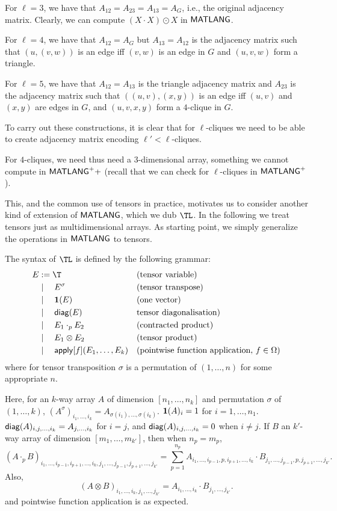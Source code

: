 For $\ell=3$, we have that $A_{12}=A_{23}=A_{13}=A_G$, i.e., the original adjacency matrix. Clearly, we can compute $(X\cdot X)\odot X$ in $\mathsf{MATLANG}$.

For $\ell=4$, we have that $A_{12}=A_G$ but $A_{13}=A_{12}$ is the adjacency matrix such that $(u,(v,w))$ is an edge iff $(v,w)$ is an edge in $G$ and
$(u,v,w)$ form a triangle.

For $\ell=5$, we have that $A_{12}=A_{13}$ is the triangle adjacency matrix and $A_{23}$ is the adjacency matrix such that $((u,v),(x,y))$ is an edge
iff $(u,v)$ and $(x,y)$ are edges in $G$, and $(u,v,x,y)$ form a $4$-clique in $G$.

To carry out these constructions, it is clear that for $\ell$-cliques we need to be able to create adjacency matrix encoding $\ell'<\ell$-cliques. 

For $4$-cliques, we need thus need a $3$-dimensional array, something we cannot compute in $\mathsf{MATLANG}^{\sf +}+$ (recall that we can check for $\ell$-cliques in $\mathsf{MATLANG}^{\sf +}$).

This, and the common use of tensors in practice, motivates us to consider another kind of extension of $\mathsf{MATLANG}$, which we dub $\TL$. In the following we treat tensors just as multidimensional arrays.
As starting point, we simply generalize the operations in $\mathsf{MATLANG}$ to tensors.

The syntax of $\TL$ is defined by the following grammar:
\begin{align*}
	E&:=\T && \text{(tensor variable)} \\
       &\mid\quad E^\sigma &&\text{(tensor transpose)}\\
        &\mid\quad \one(E) &&\text{(one vector)}\\
        &\mid\quad \diag(E) &&\text{tensor diagonalisation)}\\
    &\mid\quad E_1 \cdot_p E_2 && \text{(contracted product)} \\
        &\mid\quad E_1 \otimes E_2 && \text{(tensor product)} \\
	      &\mid\quad \Apply[f](E_1, \ldots, E_k) && \text{(pointwise function
    application, $f \in \Omega$)}
\end{align*}
where for tensor transposition $\sigma$ is a permutation of $(1,\ldots,n)$ for some appropriate $n$.

Here, for an $k$-way array $A$ of dimension $[n_1,\ldots,n_k]$ and permutation $\sigma$ of $(1,\ldots,k)$,
$(A^\sigma)_{i_1,\ldots,i_k}=A_{\sigma(i_1),\ldots,\sigma(i_k)}$. $\mathbf{1}(A)_{i}=1$ for $i=1,\ldots,n_1$.
$\mathsf{diag}(A)_{i,j,\ldots,i_k}=A_{j,\ldots,i_k}$ for $i=j$, and $\mathsf{diag}(A)_{i,j,\ldots,i_k}=0$ when $i\neq j$.
If $B$ an $k'$-way array of dimension $[m_1,\ldots,m_{k'}]$, then when $n_p=m_p$,
$$
(A\cdot_p B)_{i_1,\ldots,i_{p-1},i_{p+1},\ldots,i_k,j_1,\ldots,j_{p-1},j_{p+1},\ldots,j_{k'}}=\sum_{p=1}^{n_p} A_{i_1,\ldots,i_{p-1},p,i_{p+1},\ldots,i_k}\cdot  B_{j_1,\ldots,j_{p-1},p,j_{p+1},\ldots,j_{k'}}.
$$
Also,
$$
(A\otimes B)_{i_1,\ldots,i_k,j_1,\ldots,j_{k'}}=A_{i_1,\ldots,i_k}\cdot  B_{j_1,\ldots,j_{k'}}.
$$
and pointwise function application is as expected.


